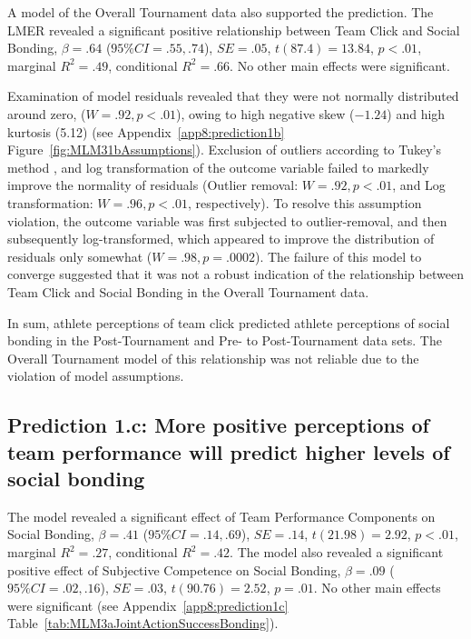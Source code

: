 \begin{CJK}{UTF8}{gbsn}
A model of the Overall Tournament data also supported the prediction. The LMER revealed a significant positive relationship between Team Click and Social Bonding, $\beta = .64$ ($95\% CI = .55, .74$), $SE = .05$, $t(87.4) = 13.84$, $p < .01$, marginal $R^2 = .49$, conditional $R^2 = .66$. No other main effects were significant.

Examination of model residuals revealed that they were not normally distributed around zero, ($W = .92, p < .01$), owing to high negative skew ($-1.24$) and high kurtosis (5.12) (see Appendix~\ref{app8:prediction1b} Figure~\ref{fig:MLM31bAssumptions}).  Exclusion of outliers according to Tukey's method \citep[observations above and below 1.5x the Inter Quartile Range (IQR); see][]{Tukey1977}, and log transformation of the outcome variable  failed to markedly improve the normality of residuals (Outlier removal: $W = .92, p < .01$, and Log transformation: $W = .96, p < .01$, respectively).  To resolve this assumption violation, the outcome variable was first subjected to outlier-removal, and then subsequently log-transformed, which appeared to improve the distribution of residuals only somewhat ($W = .98, p = .0002$).
The failure of this model to converge suggested that it was not a robust indication of the relationship between Team Click and Social Bonding in the Overall Tournament data.



In sum, athlete perceptions of team click predicted athlete perceptions of social bonding in the Post-Tournament and Pre- to Post-Tournament data sets.  The Overall Tournament model of this relationship was not reliable due to the violation of model assumptions.






\subsection{Prediction 1.c: More positive perceptions of team performance will predict higher levels of social bonding}


The model revealed a significant effect of Team Performance Components on Social Bonding, $\beta = .41$ ($95\% CI =  .14, .69$), $SE = .14$, $t(21.98) = 2.92$, $p < .01$, marginal $R^2 = .27$, conditional $R^2 = .42$.  The model also revealed a significant positive effect of Subjective Competence on Social Bonding, $\beta = .09$ ($95\% CI =  .02, .16$), $SE = .03$, $t(90.76) = 2.52$, $p = .01$. No other main effects were significant (see Appendix~\ref{app8:prediction1c} Table~\ref{tab:MLM3aJointActionSuccessBonding}).


\end{CJK}
